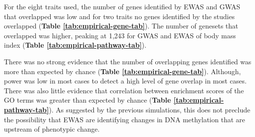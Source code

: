 \documentclass[11pt,twoside]{bristolthesis}
\begin{document}
For the eight traits used, the number of genes identified by EWAS and GWAS that overlapped was low and for two traits no genes identified by the studies overlapped (\textbf{Table \ref{tab:empirical-gene-tab}}). The number of genesets that overlapped was higher, peaking at 1,243 for GWAS and EWAS of body mass index (\textbf{Table \ref{tab:empirical-pathway-tab}}).

There was no strong evidence that the number of overlapping genes identified was more than expected by chance (\textbf{Table \ref{tab:empirical-gene-tab}}). Although, power was low in most cases to detect a high level of gene overlap in most cases. There was also little evidence that correlation between enrichment scores of the GO terms was greater than expected by chance (\textbf{Table \ref{tab:empirical-pathway-tab}}). As suggested by the previous simulations, this does not preclude the possibility that EWAS are identifying changes in DNA methylation that are upstream of phenotypic change. \linebreak
\end{document}

